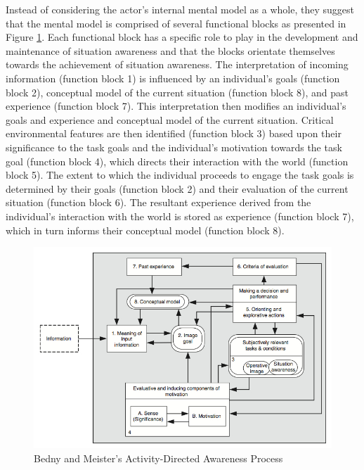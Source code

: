 Instead of considering the actor's internal mental model as a whole, they suggest that the mental model is comprised of several functional blocks as presented in Figure \ref{fig:activity_sa}. Each functional block has a specific role to play in the development and maintenance of situation awareness and that the blocks orientate themselves towards the achievement of situation awareness. The interpretation of incoming information (function block 1) is influenced by an individual’s goals (function block 2), conceptual model of the current situation (function block 8), and past experience (function block 7). This interpretation then modifies an individual’s goals and experience and conceptual model of the current situation. Critical environmental features are then identified (function block 3) based upon their significance to the task goals and the individual’s motivation towards the task goal (function block 4), which directs their interaction with the world (function block 5). The extent to which the individual proceeds to engage the task goals is determined by their goals (function block 2) and their evaluation of the current situation (function block 6). The resultant experience derived from the individual’s interaction with the world is stored as experience (function block 7), which in turn informs their conceptual model (function block 8).

\begin{figure}[htbp] %
   \centering
   \includegraphics[width=5.5in]{activity_sa.jpg} 
   \caption{Bedny and Meister's Activity-Directed Awareness Process \cite{Bedny1999}}
   \label{fig:activity_sa}
\end{figure}

